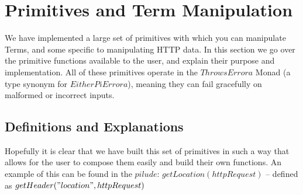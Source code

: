 \section{Primitives and Term Manipulation}

We have implemented a large set of primitives with which you can manipulate Terms, and some specific to manipulating HTTP data. In this section we go over the primitive functions available to the user, and explain their purpose and implementation. All of these primitives operate in the $ThrowsError a$ Monad (a type synonym for $Either PiError a$), meaning they can fail gracefully on malformed or incorrect inputs.
 
\subsection{Definitions and Explanations}



Hopefully it is clear that we have built this set of primitives in such a way that allows for the user to compose them easily and build their own functions. An example of this can be found in the $pilude$: $getLocation(httpRequest)$ -- defined as $getHeader("location",httpRequest)$
